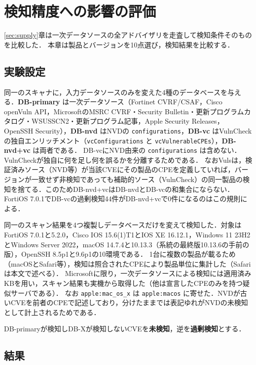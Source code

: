\section{検知精度への影響の評価}
\label{sec:eval}

\ref{sec:supply}章は一次データソースの全アドバイザリを走査して検知条件そのものを比較した．
本章は製品とバージョンを10点選び，検知結果を比較する．

\subsection{実験設定}
\label{sec:setup}

同一のスキャナ\cite{vuls}に，入力データソースのみを変えた4種のデータベースを与える．\textbf{DB-primary} は一次データソース（Fortinet CVRF/CSAF，Cisco openVuln API，MicrosoftのMSRC CVRF・Security Bulletin・更新プログラムカタログ・WSUSSCN2・更新プログラム記事，Apple Security Releases，OpenSSH Security），\textbf{DB-nvd} はNVDの \texttt{configurations}，\textbf{DB-vc} はVulnCheckの独自エンリッチメント（\texttt{vcConfigurations} と \texttt{vcVulnerableCPEs}），\textbf{DB-nvd+vc} は両者である．
DB-vcにNVD由来の \texttt{configurations} は含めない．VulnCheckが独自に何を足し何を誤るかを分離するためである．
なおVulsは，検証済みソース（NVD等）が当該CVEにその製品のCPEを定義していれば，バージョンが一致せず非検知であっても補助的ソース（VulnCheck）の同一製品の検知を捨てる．このためDB-nvd+vcはDB-nvdとDB-vcの和集合にならない．FortiOS 7.0.1でDB-vcの過剰検知44件がDB-nvd+vcで0件になるのはこの規則による．

同一のスキャン結果を4つ複製しデータベースだけを変えて検知した．対象はFortiOS 7.0.1と5.2.0，Cisco IOS 15.6(1)T1とIOS XE 16.12.1，Windows 11 23H2とWindows Server 2022，macOS 14.7.4と10.13.3（系統の最終版10.13.6の手前の版），OpenSSH 8.5p1と9.6p1の10環境である．
1台に複数の製品が載るため（macOSとSafari等），検知は照合されたCPEにより製品単位に集計した（Safariは本文で述べる）．
Microsoftに限り，一次データソースによる検知には適用済みKBを用い，スキャン結果も実機から取得した（他は宣言したCPEのみを持つ疑似サーバである）．
なお \texttt{apple:mac\_os\_x} は \texttt{apple:macos} に寄せた．NVDが古いCVEを前者のCPEで記述しており，分けたままでは表記ゆれがNVDの未検知として計上されるためである．

DB-primaryが検知しDB-Xが検知しないCVEを\textbf{未検知}，逆を\textbf{過剰検知}とする．

\subsection{結果}
\label{sec:result}

